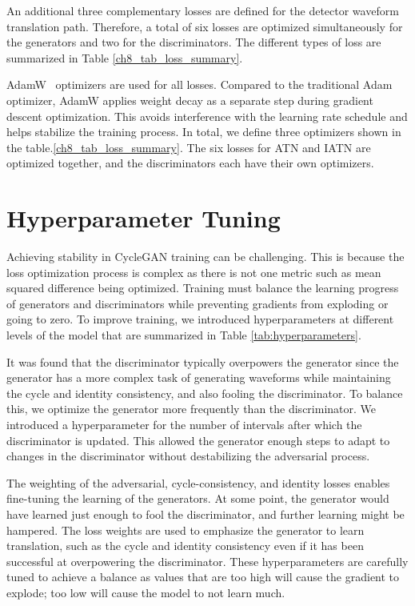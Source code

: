 An additional three complementary losses are defined for the detector waveform translation path. Therefore, a total of six losses are optimized simultaneously for the generators and two for the discriminators.  The different types of loss are summarized in Table \ref{ch8_tab_loss_summary}.



AdamW~\cite{adam_w_paper} optimizers are used for all losses. Compared to the traditional Adam optimizer, AdamW applies weight decay as a separate step during gradient descent optimization. This avoids interference with the learning rate schedule and helps stabilize the training process. In total, we define three optimizers shown in the table.\ref{ch8_tab_loss_summary}. The six losses for ATN and IATN are optimized together, and the discriminators each have their own optimizers.


\section{Hyperparameter Tuning}
Achieving stability in CycleGAN training can be challenging. This is because the loss optimization process is complex as there is not one metric such as mean squared difference being optimized. Training must balance the learning progress of generators and discriminators while preventing gradients from exploding or going to zero. To improve training, we introduced hyperparameters at different levels of the model that are summarized in Table \ref{tab:hyperparameters}.



It was found that the discriminator typically overpowers the generator since the generator has a more complex task of generating waveforms while maintaining the cycle and identity consistency, and also fooling the discriminator. To balance this, we optimize the generator more frequently than the discriminator. We introduced a hyperparameter for the number of intervals after which the discriminator is updated. This allowed the generator enough steps to adapt to changes in the discriminator without destabilizing the adversarial process.

The weighting of the adversarial, cycle-consistency, and identity losses enables fine-tuning the learning of the generators. At some point, the generator would have learned just enough to fool the discriminator, and further learning might be hampered. The loss weights are used to emphasize the generator to learn translation, such as the cycle and identity consistency even if it has been successful at overpowering the discriminator. These hyperparameters are carefully tuned to achieve a balance as values that are too high will cause the gradient to explode; too low will cause the model to not learn much. 

